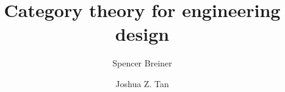 \title{Category theory for engineering design}

\author{Spencer Breiner \and Joshua Z. Tan}

\maketitle